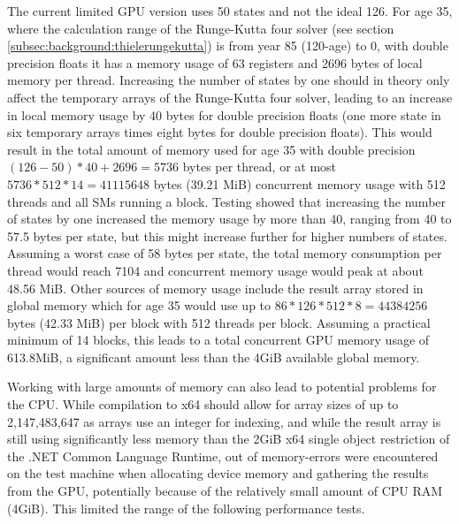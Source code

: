 The current limited GPU version uses 50 states and not the ideal 126.
For age 35, where the calculation range of the Runge-Kutta four solver (see section \ref{subsec:background:thielerungekutta}) is from year 85 (120-age) to 0, with double precision floats it has a memory usage of 63 registers and 2696 bytes of local memory per thread.
Increasing the number of states by one should in theory only affect the temporary arrays of the Runge-Kutta four solver, leading to an increase in local memory usage by 40 bytes for double precision floats (one more state in six temporary arrays times eight bytes for double precision floats).
This would result in the total amount of memory used for age 35 with double precision $(126 - 50) * 40 + 2696 = 5736$ bytes per thread, or at most $5736 * 512 * 14 = 41115648$ bytes (39.21 MiB) concurrent memory usage with 512 threads and all SMs running a block.
Testing showed that increasing the number of states by one increased the memory usage by more than 40, ranging from 40 to 57.5 bytes per state, but this might increase further for higher numbers of states.
Assuming a worst case of 58 bytes per state, the total memory consumption per thread would reach 7104 and concurrent memory usage would peak at about 48.56 MiB.
Other sources of memory usage include the result array stored in global memory which for age 35 would use up to $86 * 126 * 512 * 8 = 44384256$ bytes (42.33 MiB) per block with 512 threads per block.
Assuming a practical minimum of 14 blocks, this leads to a total concurrent GPU memory usage of 613.8MiB, a significant amount less than the 4GiB available global memory.

Working with large amounts of memory can also lead to potential problems for the CPU.
While compilation to x64 should allow for array sizes of up to 2,147,483,647 as arrays use an integer for indexing, and while the result array is still using significantly less memory than the 2GiB x64 single object restriction of the .NET Common Language Runtime, out of memory-errors were encountered on the test machine when allocating device memory and gathering the results from the GPU, potentially because of the relatively small amount of CPU RAM (4GiB).
This limited the range of the following performance tests.

